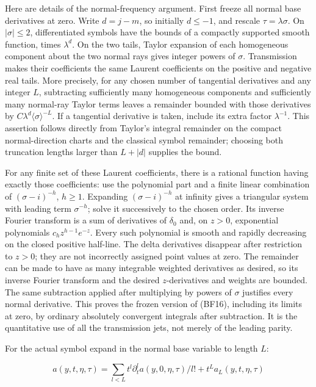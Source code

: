 \documentclass[
  11pt,
]{article}
\begin{document}
Here are details of the normal-frequency argument. First freeze all
normal base derivatives at zero. Write \(d=j-m\), so initially
\(d\leq-1\), and rescale \(\tau=\lambda\sigma\). On \(|\sigma|\leq2\),
differentiated symbols have the bounds of a compactly supported smooth
function, times \(\lambda^d\). On the two tails, Taylor expansion of
each homogeneous component about the two normal rays gives integer
powers of \(\sigma\). Transmission makes their coefficients the same
Laurent coefficients on the positive and negative real tails. More
precisely, for any chosen number of tangential derivatives and any
integer \(L\), subtracting sufficiently many homogeneous components and
sufficiently many normal-ray Taylor terms leaves a remainder bounded
with those derivatives by \(C\lambda^d\langle\sigma\rangle^{-L}\). If a
tangential derivative is taken, include its extra factor
\(\lambda^{-1}\). This assertion follows directly from Taylor's integral
remainder on the compact normal-direction charts and the classical
symbol remainder; choosing both truncation lengths larger than \(L+|d|\)
supplies the bound.

For any finite set of these Laurent coefficients, there is a rational
function having exactly those coefficients: use the polynomial part and
a finite linear combination of \((\sigma-i)^{-h}\), \(h\geq1\).
Expanding \((\sigma-i)^{-h}\) at infinity gives a triangular system with
leading term \(\sigma^{-h}\); solve it successively to the chosen order.
Its inverse Fourier transform is a sum of derivatives of \(\delta_0\)
and, on \(z>0\), exponential polynomials \(c_hz^{h-1}e^{-z}\). Every
such polynomial is smooth and rapidly decreasing on the closed positive
half-line. The delta derivatives disappear after restriction to \(z>0\);
they are not incorrectly assigned point values at zero. The remainder
can be made to have as many integrable weighted derivatives as desired,
so its inverse Fourier transform and the desired \(z\)-derivatives and
weights are bounded. The same subtraction applied after multiplying by
powers of \(\sigma\) justifies every normal derivative. This proves the
frozen version of (BF16), including its limits at zero, by ordinary
absolutely convergent integrals after subtraction. It is the
quantitative use of all the transmission jets, not merely of the leading
parity.

For the actual symbol expand in the normal base variable to length
\(L\):

\[a(y,t,\eta,\tau)=\sum_{l<L}t^l\partial_t^la(y,0,\eta,\tau)/l!+t^La_L(y,t,\eta,\tau)\]
\end{document}
